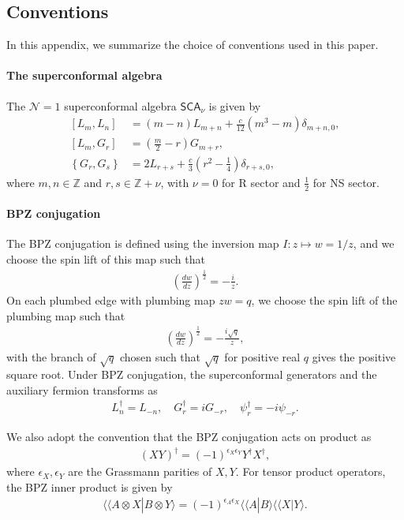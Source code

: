 \documentclass[12pt]{article}
\def\ie{\begin{equation}\begin{aligned}}
\def\fe{\end{aligned}\end{equation}}
\begin{document}
\begin{appendix}

\section{Conventions}

\label{app:conventions}

In this appendix, we summarize the choice of conventions used in this paper. 

\paragraph{The superconformal algebra}
The $\mathcal{N}=1$ superconformal algebra $\mathsf{SCA}_\nu$ is given by
\ie
\left[L_m,L_n\right]
&=(m-n)L_{m+n}
+\frac{c}{12}\left(m^3-m\right)\delta_{m+n,0},\\
\left[L_m,G_r\right]
&=\left(\frac{m}{2}-r\right)G_{m+r},\\
\left\{G_r,G_s\right\}
&=2L_{r+s}
+\frac{c}{3}\left(r^2-\frac14\right)\delta_{r+s,0},
\fe
where $m,n\in \mathbb{Z}$ and $r,s\in \mathbb{Z}+\nu$, with $\nu = 0$ for R sector and $\frac12$ for NS sector.

\paragraph{BPZ conjugation}

The BPZ conjugation is defined using the inversion map $I: z\mapsto w=1/z$, and we choose the spin lift of this map such that
\ie
\left(\frac{dw}{dz}\right)^{\frac12} = -\frac{i}{z}.
\fe
On each plumbed edge with plumbing map $zw=q$, we choose the spin lift of the plumbing map such that 
\ie
\left(\frac{dw}{dz}\right)^{\frac12} = -\frac{i\sqrt{q}}{z},
\fe
with the branch of $\sqrt{q}$ chosen such that $\sqrt{q}$ for positive real $q$ gives the positive square root. Under BPZ conjugation, the superconformal generators and the auxiliary fermion transforms as
\ie \label{BPZgenerator}
L_n^\dagger = L_{-n},\quad G_r^\dagger = iG_{-r},\quad \psi_r^\dagger = -i\psi_{-r}.
\fe

We also adopt the convention that the BPZ conjugation acts on product as 
\ie 
(XY)^\dagger = (-1)^{\epsilon_X\epsilon_Y}Y^\dagger X^\dagger,
\fe
where $\epsilon_X, \epsilon_Y$ are the Grassmann parities of $X, Y$. For tensor product operators, the BPZ inner product is given by
\ie \label{BPZtensor}
\langle \langle A\otimes X| B\otimes Y\rangle =(-1)^{\epsilon_A\epsilon_X}\langle \langle A|B\rangle\langle \langle X|Y\rangle.
\fe


\end{appendix}
\end{document}
